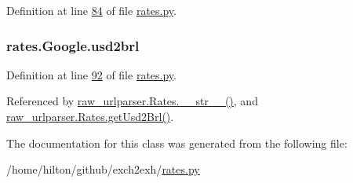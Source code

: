 Definition at line \hyperlink{rates_8py_source_l00084}{84} of file \hyperlink{rates_8py_source}{rates.\+py}.

\subsubsection[{\texorpdfstring{usd2brl}{usd2brl}}]{\setlength{\rightskip}{0pt plus 5cm}rates.\+Google.\+usd2brl}\hypertarget{classrates_1_1_google_a94c28f6d60d5d6afc075416d7378471c}{}\label{classrates_1_1_google_a94c28f6d60d5d6afc075416d7378471c}


Definition at line \hyperlink{rates_8py_source_l00092}{92} of file \hyperlink{rates_8py_source}{rates.\+py}.



Referenced by \hyperlink{raw__urlparser_8py_source_l00038}{raw\+\_\+urlparser.\+Rates.\+\_\+\+\_\+str\+\_\+\+\_\+()}, and \hyperlink{raw__urlparser_8py_source_l00032}{raw\+\_\+urlparser.\+Rates.\+get\+Usd2\+Brl()}.



The documentation for this class was generated from the following file\+:\begin{DoxyCompactItemize}
\item 
/home/hilton/github/exch2exh/\hyperlink{rates_8py}{rates.\+py}\end{DoxyCompactItemize}
